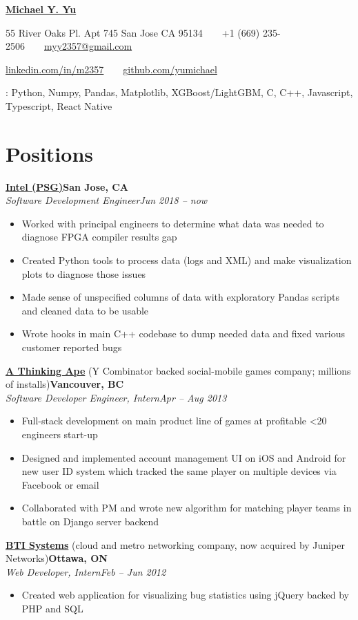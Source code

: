 \documentclass[10pt,letterpaper]{article}
\newcommand*\textul[1]{\underline{\smash{#1}}}
\newcommand*\company[1]{\textbf{#1}}
\newcommand*\position[1]{\textit{#1}}
\newcommand*\location\company
\newcommand*\timespan\position
\newcommand*\lead\textul
\begin{document}
\pagestyle{empty}
\begin{center}
{\huge\textbf{\href{https://github.com/yumichael/resume-v5}{Michael Y. Yu}}}

55 River Oaks Pl. Apt 745 San Jose CA 95134\ \ \textbullet\ \ +1 (669) 235-2506\ \ \textbullet\ \ \href{mailto:myy2357@gmail.com}{myy2357@gmail.com}

\href{https://www.linkedin.com/in/m2357/}{linkedin.com/in/m2357}\ \ \textbullet\ \ \href{https://github.com/yumichael}{github.com/yumichael}
\end{center}
\lead{Key Skills}: Python, Numpy, Pandas, Matplotlib, XGBoost/LightGBM, C, C++, Javascript, Typescript, React Native

\section*{Positions}
\company{\href{https://www.intel.com/content/www/us/en/products/programmable.html}{Intel (PSG)}}\hfill\location{San Jose, CA}\\
\position{Software Development Engineer}\hfill\timespan{Jun 2018 -- now}
\begin{itemize}
\item Worked with principal engineers to determine what data was needed to diagnose FPGA compiler results gap
\item Created Python tools to process data (logs and XML) and make visualization plots to diagnose those issues
\item Made sense of unspecified columns of data with exploratory Pandas scripts and cleaned data to be usable
\item Wrote hooks in main C++ codebase to dump needed data and fixed various customer reported bugs
\end{itemize}
\company{\href{http://www.athinkingape.com/}{A Thinking Ape}} (Y Combinator backed social-mobile games company; millions of installs)\hfill\location{Vancouver, BC}\\
\position{Software Developer Engineer, Intern}\hfill\timespan{Apr -- Aug 2013}
\begin{itemize}
\item Full-stack development on main product line of games at profitable <20 engineers start-up
\item Designed and implemented account management UI on iOS and Android for new user ID system which tracked the same player on multiple devices via Facebook or email
\item Collaborated with PM and wrote new algorithm for matching player teams in battle on Django server backend
\end{itemize}
\company{\href{http://www.juniper.net/us/en/dm/bti/}{BTI Systems}} (cloud and metro networking company, now acquired by Juniper Networks)\hfill\location{Ottawa, ON}\\
\position{Web Developer, Intern}\hfill\timespan{Feb -- Jun 2012}
\begin{itemize}
\item Created web application for visualizing bug statistics using jQuery backed by PHP and SQL
\end{itemize}
\end{document}
